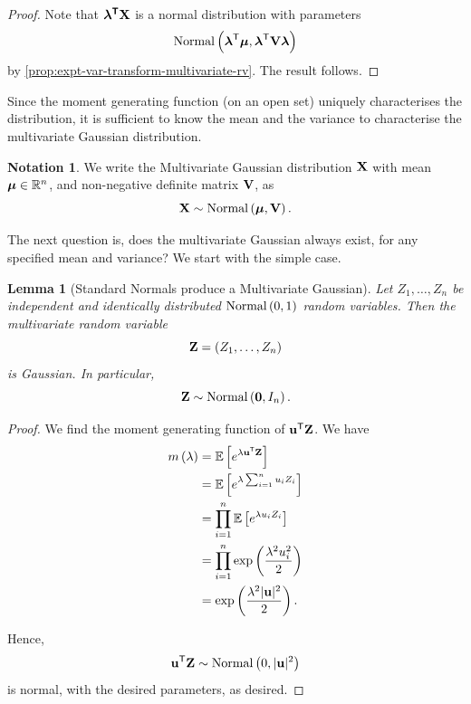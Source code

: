 \documentclass{article}
\newtheorem{lemma}[theorem]{Lemma}
\theoremstyle{definition}
\newtheorem{notation}[theorem]{Notation}
\theoremstyle{remark}
\DeclarePairedDelimiter{\abs}{\lvert}{\rvert}
\newcommand{\RR}{\mathbb{R}}
\newcommand{\Expt}{\mathbb{E}}
\newcommand{\transpose}{^{\mathsf{T}}}
\newcommand{\identityM}{I}
\newcommand{\Normal}{\operatorname{Normal}}
\begin{document}
\begin{proof}
    Note that \(\vb*{\lambda \transpose \vb{X}}\) is a normal distribution with parameters
    \[
        \Normal\pqty{\vb*{\lambda}\transpose\vb*{\mu}, \vb*{\lambda}\transpose \vb{V} \vb*{\lambda}}
    \]
    by \autoref{prop:expt-var-transform-multivariate-rv}. The result follows.
\end{proof}

Since the moment generating function (on an open set) uniquely characterises the distribution, it is sufficient to know the mean and the variance to characterise the multivariate Gaussian distribution.

\begin{notation}
    We write the Multivariate Gaussian distribution \(\vb{X}\) with mean \(\vb*{\mu} \in \RR^n\), and non-negative definite matrix \(\vb{V}\), as
    \[
        \vb{X} \sim \Normal\pqty{\vb*{\mu}, \vb{V}}.
    \]
\end{notation}

The next question is, does the multivariate Gaussian always exist, for any specified mean and variance? We start with the simple case. 

\begin{lemma}[Standard Normals produce a Multivariate Gaussian]
    \label{lem:standard-normal-multivariate-gaussian}%
    Let \(Z_1, \ldots, Z_n\) be independent and identically distributed \(\Normal\pqty{0, 1}\) random variables. Then the multivariate random variable
    \[
        \vb{Z} = \pqty{Z_1, \ldots, Z_n}
    \]
    is Gaussian. In particular,
    \[
        \vb{Z} \sim \Normal\pqty{\vb{0}, \identityM_n}.
    \]
\end{lemma}

\begin{proof}
    We find the moment generating function of \(\vb{u} \transpose \vb{Z}\). We have
    \begin{align*}
        m\pqty{\lambda} &= \Expt\bqty{e^{\lambda \vb{u}\transpose \vb{Z}}} \\
        &= \Expt\bqty{e^{\lambda \sum_{i = 1}^{n} u_i Z_i}} \\
        &= \prod_{i = 1}^{n} \Expt\bqty{e^{\lambda u_i Z_i}} \\
        &= \prod_{i = 1}^{n} \exp\pqty{\frac{\lambda^2 u_i^2}{2}} \\
        &= \exp\pqty{\frac{\lambda^2 \abs{\vb{u}}^2}{2}}.
    \end{align*}

    Hence,
    \[
        \vb{u}\transpose \vb{Z} \sim \Normal \pqty{0, \abs{\vb{u}}^2}
    \]
    is normal, with the desired parameters, as desired.
\end{proof}
\end{document}
